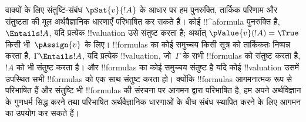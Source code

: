 \documentclass[../../../include/open-logic-section]{subfiles}
\begin{document}
वाक्यों के लिए संतुष्टि-संबंध $\pSat{v}{!A}$ के आधार पर हम पुनरुक्ति, तार्किक
परिणाम और संतुष्टता की मूल अर्थवैज्ञानिक धारणाएँ परिभाषित कर सकते हैं। कोई
!!^a{formula} पुनरुक्ति है, $\Entails !A$, यदि प्रत्येक !!{valuation} उसे
संतुष्ट करता है; अर्थात् $\pValue{v}(!A) = \True$ किसी भी~$\pAssign{v}$ के
लिए। !!{formula}s का कोई समुच्चय किसी सूत्र को तार्किकतः निष्पन्न करता है,
$\Gamma \Entails !A$, यदि प्रत्येक !!{valuation}, जो~$\Gamma$ के सभी
!!{formula}s को संतुष्ट करता है, $!A$ को भी संतुष्ट करता है। और
!!{formula}s का कोई समुच्चय संतुष्ट है यदि कोई !!{valuation} उसमें उपस्थित सभी
!!{formula}s को एक साथ संतुष्ट करता हो। क्योंकि !!{formula}s आगमनात्मक रूप से
परिभाषित हैं और संतुष्टि भी !!{formula}s की संरचना पर आगमन द्वारा परिभाषित है,
हम अपने अर्थविज्ञान के गुणधर्म सिद्ध करने तथा परिभाषित अर्थवैज्ञानिक धारणाओं के
बीच संबंध स्थापित करने के लिए आगमन का उपयोग कर सकते हैं।
\end{document}
